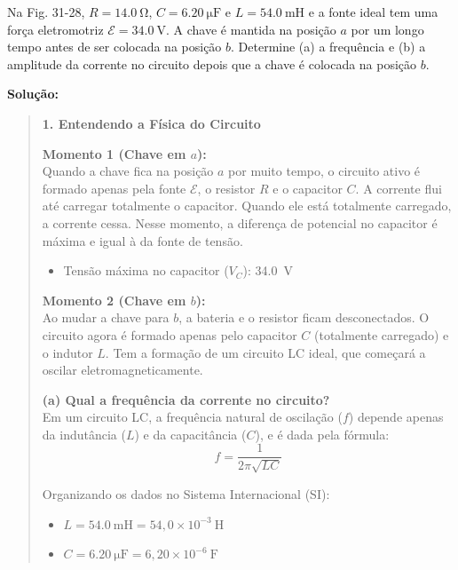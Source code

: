 \documentclass[12pt,a4paper]{article}
\begin{document}
Na Fig. 31-28, $R = \SI{14,0}{\ohm}$, $C = \SI{6,20}{\micro\farad}$ e $L = \SI{54,0}{\milli\henry}$ e a fonte ideal tem uma força eletromotriz $\mathscr{E} = \SI{34,0}{\volt}$. A chave é mantida na posição $a$ por um longo tempo antes de ser colocada na posição $b$. Determine (a) a frequência e (b) a amplitude da corrente no circuito depois que a chave é colocada na posição $b$.

\vspace{0.2cm}


\textbf{Solução:}
\begin{quote}

\noindent \textbf{1. Entendendo a Física do Circuito}

\vspace{0.2cm}
\noindent \textbf{Momento 1 (Chave em $a$):} \\
Quando a chave fica na posição $a$ por muito tempo, o circuito ativo é formado apenas pela fonte $\mathscr{E}$, o resistor $R$ e o capacitor $C$. A corrente flui até carregar totalmente o capacitor. Quando ele está totalmente carregado, a corrente cessa. Nesse momento, a diferença de potencial no capacitor é máxima e igual à da fonte de tensão.
\begin{itemize}
    \item Tensão máxima no capacitor ($V_C$): \SI{34,0}{\volt}
\end{itemize}

\vspace{0.2cm}
\noindent \textbf{Momento 2 (Chave em $b$):} \\
Ao mudar a chave para $b$, a bateria e o resistor ficam desconectados. O circuito agora é formado apenas pelo capacitor $C$ (totalmente carregado) e o indutor $L$. Tem a formação de um circuito LC ideal, que começará a oscilar eletromagneticamente.

\vspace{0.4cm}
\noindent \textbf{(a) Qual a frequência da corrente no circuito?} \\
Em um circuito LC, a frequência natural de oscilação ($f$) depende apenas da indutância ($L$) e da capacitância ($C$), e é dada pela fórmula:
\[
f = \frac{1}{2\pi \sqrt{LC}}
\]

\noindent Organizando os dados no Sistema Internacional (SI):
\begin{itemize}
    \item $L = \SI{54,0}{\milli\henry} = 54,0 \times 10^{-3}\ \text{H}$
    \item $C = \SI{6,20}{\micro\farad} = 6,20 \times 10^{-6}\ \text{F}$
\end{itemize}


\end{quote}
\end{document}

